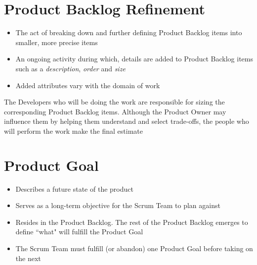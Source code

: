 \documentclass[a4paper,11pt,twocolumn]{article}
\begin{document}
\section*{Product Backlog Refinement}
\begin{itemize}
	\item The act of breaking down and further defining Product Backlog items into smaller, more precise items
	\item An ongoing activity during which, details are added to Product Backlog items such as a \textit{description}, \textit{order} and \textit{size}
	\item Added attributes vary with the domain of work
\end{itemize}

\begin{tcolorbox}[colback=black!8!white,colframe=gray!50!black,title=Note,sharp corners,fonttitle=\normalsize\bfseries,fontupper=\normalsize,left=0.7em,right=0.7em]
	The Developers who will be doing the work are responsible for sizing the corresponding Product Backlog items. Although the Product Owner may influence them by helping them understand and select trade-offs, the people who will perform the work make the final estimate
\end{tcolorbox}

\section*{Product Goal}
\begin{itemize}
	\item Describes a future state of the product 
	\item Serves as a long-term objective for the Scrum Team to plan against
	\item Resides in the Product Backlog. The rest of the Product Backlog emerges to define ``what" will fulfill the Product Goal
	\item The Scrum Team must fulfill (or abandon) one Product Goal before taking on the next
\end{itemize}
\end{document}

